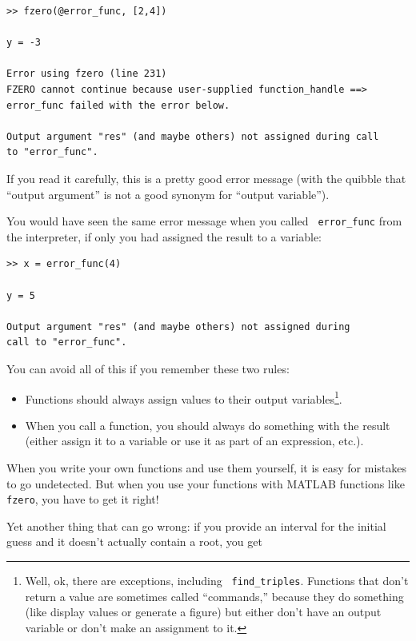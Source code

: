 \documentclass{book}
\begin{document}
\begin{verbatim}
>> fzero(@error_func, [2,4])

y = -3

Error using fzero (line 231)
FZERO cannot continue because user-supplied function_handle ==> 
error_func failed with the error below.

Output argument "res" (and maybe others) not assigned during call
to "error_func".
\end{verbatim}

If you read it carefully, this is a pretty good error message
(with the quibble that ``output argument'' is not a good synonym
for ``output variable'').

You would have seen the same error message when you called {\tt
error\_func} from the interpreter, if only you had assigned the result
to a variable:

\begin{verbatim}
>> x = error_func(4)

y = 5

Output argument "res" (and maybe others) not assigned during 
call to "error_func".
\end{verbatim}

You can avoid all of this if you remember these two rules:

\begin{itemize}

\item Functions should always assign values to their output
variables\footnote{Well, ok, there are exceptions, including {\tt
find\_triples}.  Functions that don't return a value are sometimes
called ``commands,'' because they do something (like display values or
generate a figure) but either don't have an output variable or don't
make an assignment to it.}.

\item When you call a function, you should always do something with
the result (either assign it to a variable or use it as part of an
expression, etc.).

\end{itemize}

When you write your own functions and use them yourself, it is easy
for mistakes to go undetected.  But when you use your functions with
MATLAB functions like {\tt fzero}, you have to get it right!

Yet another thing that can go wrong: if you provide an interval for the
initial guess and it doesn't actually contain a root, you get
\end{document}
